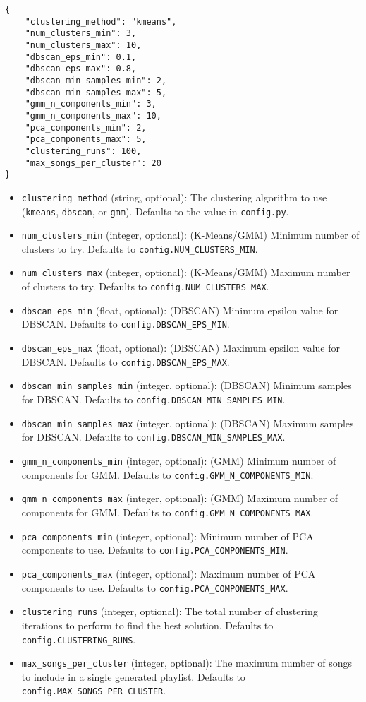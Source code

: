\documentclass{article}
\begin{document}
\lstset{language=json, caption=Example Request Body: Start Music Clustering Task}
\begin{lstlisting}
{
    "clustering_method": "kmeans",
    "num_clusters_min": 3,
    "num_clusters_max": 10,
    "dbscan_eps_min": 0.1,
    "dbscan_eps_max": 0.8,
    "dbscan_min_samples_min": 2,
    "dbscan_min_samples_max": 5,
    "gmm_n_components_min": 3,
    "gmm_n_components_max": 10,
    "pca_components_min": 2,
    "pca_components_max": 5,
    "clustering_runs": 100,
    "max_songs_per_cluster": 20
}
\end{lstlisting}
\begin{itemize}[noitemsep]
    \item \texttt{clustering\_method} (string, optional): The clustering algorithm to use (\texttt{kmeans}, \texttt{dbscan}, or \texttt{gmm}). Defaults to the value in \texttt{config.py}.
    \item \texttt{num\_clusters\_min} (integer, optional): (K-Means/GMM) Minimum number of clusters to try. Defaults to \texttt{config.NUM\_CLUSTERS\_MIN}.
    \item \texttt{num\_clusters\_max} (integer, optional): (K-Means/GMM) Maximum number of clusters to try. Defaults to \texttt{config.NUM\_CLUSTERS\_MAX}.
    \item \texttt{dbscan\_eps\_min} (float, optional): (DBSCAN) Minimum epsilon value for DBSCAN. Defaults to \texttt{config.DBSCAN\_EPS\_MIN}.
    \item \texttt{dbscan\_eps\_max} (float, optional): (DBSCAN) Maximum epsilon value for DBSCAN. Defaults to \texttt{config.DBSCAN\_EPS\_MAX}.
    \item \texttt{dbscan\_min\_samples\_min} (integer, optional): (DBSCAN) Minimum samples for DBSCAN. Defaults to \texttt{config.DBSCAN\_MIN\_SAMPLES\_MIN}.
    \item \texttt{dbscan\_min\_samples\_max} (integer, optional): (DBSCAN) Maximum samples for DBSCAN. Defaults to \texttt{config.DBSCAN\_MIN\_SAMPLES\_MAX}.
    \item \texttt{gmm\_n\_components\_min} (integer, optional): (GMM) Minimum number of components for GMM. Defaults to \texttt{config.GMM\_N\_COMPONENTS\_MIN}.
    \item \texttt{gmm\_n\_components\_max} (integer, optional): (GMM) Maximum number of components for GMM. Defaults to \texttt{config.GMM\_N\_COMPONENTS\_MAX}.
    \item \texttt{pca\_components\_min} (integer, optional): Minimum number of PCA components to use. Defaults to \texttt{config.PCA\_COMPONENTS\_MIN}.
    \item \texttt{pca\_components\_max} (integer, optional): Maximum number of PCA components to use. Defaults to \texttt{config.PCA\_COMPONENTS\_MAX}.
    \item \texttt{clustering\_runs} (integer, optional): The total number of clustering iterations to perform to find the best solution. Defaults to \texttt{config.CLUSTERING\_RUNS}.
    \item \texttt{max\_songs\_per\_cluster} (integer, optional): The maximum number of songs to include in a single generated playlist. Defaults to \texttt{config.MAX\_SONGS\_PER\_CLUSTER}.
\end{itemize}
\end{document}
